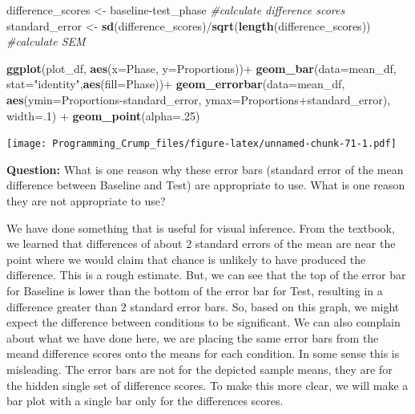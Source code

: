 \documentclass[]{book}
\newenvironment{Shaded}{\begin{snugshade}}{\end{snugshade}}
\newcommand{\KeywordTok}[1]{\textcolor[rgb]{0.13,0.29,0.53}{\textbf{{#1}}}}
\newcommand{\DataTypeTok}[1]{\textcolor[rgb]{0.13,0.29,0.53}{{#1}}}
\newcommand{\DecValTok}[1]{\textcolor[rgb]{0.00,0.00,0.81}{{#1}}}
\newcommand{\StringTok}[1]{\textcolor[rgb]{0.31,0.60,0.02}{{#1}}}
\newcommand{\CommentTok}[1]{\textcolor[rgb]{0.56,0.35,0.01}{\textit{{#1}}}}
\newcommand{\NormalTok}[1]{{#1}}
\theoremstyle{definition}
\theoremstyle{definition}
\theoremstyle{definition}
\theoremstyle{remark}
\begin{document}
\begin{Shaded}
\begin{Highlighting}[]
\NormalTok{difference_scores <-}\StringTok{ }\NormalTok{baseline-test_phase }\CommentTok{#calculate difference scores}
\NormalTok{standard_error <-}\StringTok{ }\KeywordTok{sd}\NormalTok{(difference_scores)/}\KeywordTok{sqrt}\NormalTok{(}\KeywordTok{length}\NormalTok{(difference_scores)) }\CommentTok{#calculate SEM}


\KeywordTok{ggplot}\NormalTok{(plot_df, }\KeywordTok{aes}\NormalTok{(}\DataTypeTok{x=}\NormalTok{Phase, }\DataTypeTok{y=}\NormalTok{Proportions))+}\StringTok{ }
\StringTok{  }\KeywordTok{geom_bar}\NormalTok{(}\DataTypeTok{data=}\NormalTok{mean_df, }\DataTypeTok{stat=}\StringTok{"identity"}\NormalTok{,}\KeywordTok{aes}\NormalTok{(}\DataTypeTok{fill=}\NormalTok{Phase))+}
\StringTok{  }\KeywordTok{geom_errorbar}\NormalTok{(}\DataTypeTok{data=}\NormalTok{mean_df, }\KeywordTok{aes}\NormalTok{(}\DataTypeTok{ymin=}\NormalTok{Proportions-standard_error, }
                                  \DataTypeTok{ymax=}\NormalTok{Proportions+standard_error), }\DataTypeTok{width=}\NormalTok{.}\DecValTok{1}\NormalTok{) +}
\StringTok{  }\KeywordTok{geom_point}\NormalTok{(}\DataTypeTok{alpha=}\NormalTok{.}\DecValTok{25}\NormalTok{)}
\end{Highlighting}
\end{Shaded}

\texttt{[image: Programming\_Crump\_files/figure-latex/unnamed-chunk-71-1.pdf]}

\textbf{Question:} What is one reason why these error bars (standard
error of the mean difference between Baseline and Test) are appropriate
to use. What is one reason they are not appropriate to use?

We have done something that is useful for visual inference. From the
textbook, we learned that differences of about 2 standard errors of the
mean are near the point where we would claim that chance is unlikely to
have produced the difference. This is a rough estimate. But, we can see
that the top of the error bar for Baseline is lower than the bottom of
the error bar for Test, resulting in a difference greater than 2
standard error bars. So, based on this graph, we might expect the
difference between conditions to be significant. We can also complain
about what we have done here, we are placing the same error bars from
the meand difference scores onto the means for each condition. In some
sense this is misleading. The error bars are not for the depicted sample
means, they are for the hidden single set of difference scores. To make
this more clear, we will make a bar plot with a single bar only for the
differences scores.
\end{document}
